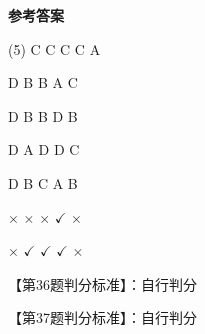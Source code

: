 \documentclass[11pt, a4paper]{article}
\begin{document}
\begin{center}
    \Huge \textbf{参考答案}
\end{center}

    \begin{tasks}[label=\arabic*. , label-width=14pt](5)
        \task C
        \task C
        \task C
        \task C
        \task A

        \task D
        \task B
        \task B
        \task A
        \task C

        \task D
        \task B
        \task B
        \task D
        \task B

        \task D
        \task A
        \task D
        \task D
        \task C

        \task D
        \task B
        \task C
        \task A
        \task B

        \task $\times$
        \task $\times$
        \task $\times$
        \task $\checkmark$
        \task $\times$

        \task $\times$
        \task $\checkmark$
        \task $\checkmark$
        \task $\checkmark$
        \task $\times$
    \end{tasks}

    【第36题判分标准】：自行判分

    【第37题判分标准】：自行判分
\end{document}

